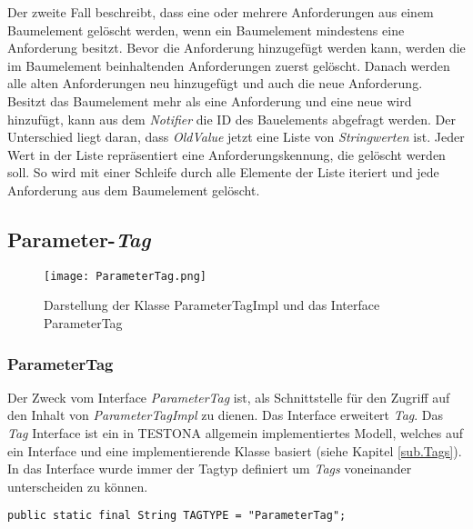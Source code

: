 Der zweite Fall beschreibt, dass eine oder mehrere Anforderungen aus einem Baumelement gelöscht werden, wenn ein Baumelement mindestens eine Anforderung besitzt. Bevor die Anforderung hinzugefügt werden kann, werden die im Baumelement beinhaltenden Anforderungen zuerst gelöscht. Danach werden alle alten Anforderungen neu hinzugefügt und auch die neue Anforderung.\\


Besitzt das Baumelement mehr als eine Anforderung und eine neue wird hinzufügt, kann aus dem \textit{Notifier} die ID des Bauelements abgefragt werden. Der Unterschied liegt daran, dass \textit{OldValue} jetzt eine Liste von \textit{Stringwerten} ist. Jeder Wert in der Liste repräsentiert eine Anforderungskennung, die gelöscht werden soll. So wird mit einer Schleife durch alle Elemente der Liste iteriert und jede Anforderung aus dem Baumelement gelöscht.\\



\subsection{Parameter-\textit{Tag}}\label{sub.ParameterTag}


\begin{figure}[h!]
  \begin{center}
    \texttt{[image: ParameterTag.png]}
  		  \caption{Darstellung der Klasse ParameterTagImpl und das Interface ParameterTag}
     \label{uml.ParameterTag}
  \end{center}
\end{figure}


\subsubsection{ParameterTag}
Der Zweck vom Interface \textit{ParameterTag} ist, als Schnittstelle für den Zugriff auf den Inhalt von \textit{ParameterTagImpl} zu dienen. Das Interface erweitert \textit{Tag}. Das \textit{Tag} Interface ist ein in TESTONA allgemein implementiertes Modell, welches auf ein Interface und eine implementierende Klasse basiert (siehe Kapitel \ref{sub.Tags}). In das Interface wurde immer der Tagtyp definiert um \textit{Tags} voneinander unterscheiden zu können.

\begin{lstlisting}
public static final String TAGTYPE = "ParameterTag";
\end{lstlisting}

